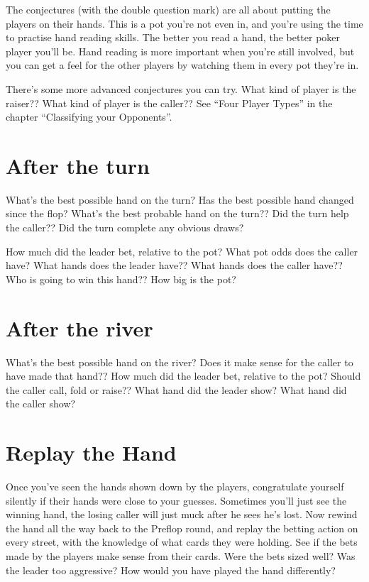 The conjectures (with the double question mark)
are all about putting the players on their hands. This is
a pot you're not even in, and you're using the time to practise hand reading
skills. The better you read a hand, the better poker player you'll be.
Hand reading is more important when you're still involved, but you can get
a feel for the other players by watching them in every pot they're in.

There's some more advanced conjectures you can try. What kind of player
is the raiser?? What kind of player is the caller?? See ``Four Player Types''
in the chapter ``Classifying your Opponents''.

\section{After the turn}

What's the best possible hand on the turn? Has the best possible hand
changed since the flop? What's the best probable hand on the turn??
Did the turn help the caller?? Did the turn complete any obvious draws?

How much did the leader bet, relative to the pot? What pot odds does
the caller have? What hands does the leader have?? What hands does the
caller have?? Who is going to win this hand?? How big is the pot?

\section{After the river}

What's the best possible hand on the river? Does it make sense for the
caller to have made that hand?? How much did the leader bet, relative
to the pot? Should the caller call, fold or raise?? What hand did
the leader show? What hand did the caller show?

\section{Replay the Hand}

Once you've seen the hands shown down by the players, congratulate yourself
silently if their hands were close to your guesses. Sometimes you'll just
see the winning hand, the losing caller will just muck after he sees he's lost. Now rewind the hand all the
way back to the Preflop round, and replay the betting action on every street,
with the knowledge of what cards they were holding. See if the bets made by the
players make sense from their cards. Were the bets sized well? Was the leader
too aggressive? How would you have played the hand differently?

